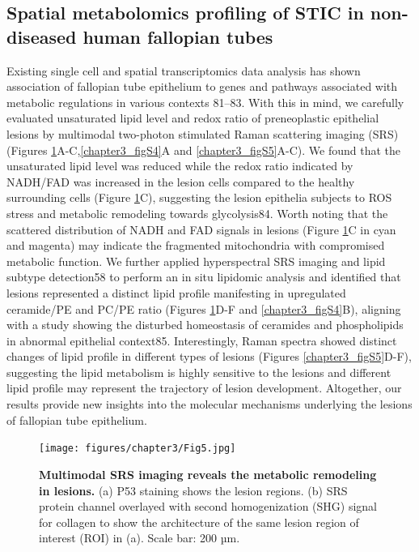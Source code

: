 \begin{refsection}
    
    \subsection{Spatial metabolomics profiling of STIC in non-diseased human fallopian tubes}
    Existing single cell and spatial transcriptomics data analysis has shown association of fallopian tube epithelium to genes and pathways associated with metabolic regulations in various contexts\cite{Dinh2021Single,Ulrich2022Cellular,Weigert2025cell} 81–83. With this in mind, we carefully evaluated unsaturated lipid level and redox ratio of preneoplastic epithelial lesions by multimodal two-photon stimulated Raman scattering imaging (SRS) (Figures \ref{chapter3_fig5}A-C,\ref{chapter3_figS4}A and \ref{chapter3_figS5}A-C). We found that the unsaturated lipid level was reduced while the redox ratio indicated by NADH/FAD was increased in the lesion cells compared to the healthy surrounding cells (Figure \ref{chapter3_fig5}C), suggesting the lesion epithelia subjects to ROS stress and metabolic remodeling towards glycolysis\cite{Alhallak2016Optical}84. Worth noting that the scattered distribution of NADH and FAD signals in lesions (Figure \ref{chapter3_fig5}C in cyan and magenta) may indicate the fragmented mitochondria with compromised metabolic function.  We further applied hyperspectral SRS imaging and lipid subtype detection\cite{Zhang2024Multi}58 to perform an in situ lipidomic analysis and identified that lesions represented a distinct lipid profile manifesting in upregulated ceramide/PE and PC/PE ratio (Figures \ref{chapter3_fig5}D-F and \ref{chapter3_figS4}B), aligning with a study showing the disturbed homeostasis of ceramides and phospholipids in abnormal epithelial context\cite{Gao2013Aberrant}85. 
    Interestingly, Raman spectra showed distinct changes of lipid profile in different types of lesions (Figures \ref{chapter3_figS5}D-F), suggesting the lipid metabolism is highly sensitive to the lesions and different lipid profile may represent the trajectory of lesion development. Altogether, our results provide new insights into the molecular mechanisms underlying the lesions of fallopian tube epithelium.


    \begin{figure}[p]
        \begin{center}
            \texttt{[image: figures/chapter3/Fig5.jpg]}
            \captionsetup{font=small}
            \caption{ \textbf{Multimodal SRS imaging reveals the metabolic remodeling in lesions.} (a) P53 staining shows the lesion regions. (b) SRS protein channel overlayed with second homogenization (SHG) signal for collagen to show the architecture of the same lesion region of interest (ROI) in (a). Scale bar: 200 µm.}
            \label{chapter3_fig5}
        \end{center}
    \end{figure}
    

\end{refsection}
